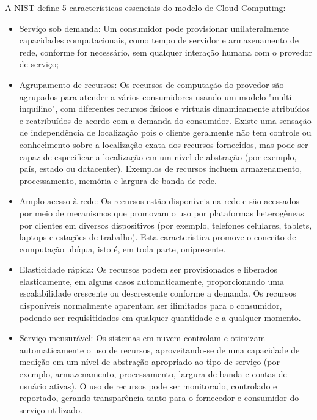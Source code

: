 A NIST define 5 características essenciais do modelo de Cloud Computing:
\begin{itemize}
	\item Serviço sob demanda: Um consumidor pode provisionar unilateralmente capacidades computacionais, como tempo de servidor e armazenamento de rede, conforme for necessário, sem qualquer interação humana com o provedor de serviço;
	\item Agrupamento de recursos: Os recursos de computação do provedor são agrupados para atender a vários consumidores usando um modelo "multi inquilino", com diferentes recursos físicos e virtuais dinamicamente atribuídos e reatribuídos de acordo com a demanda do consumidor. Existe uma sensação de independência de localização pois o cliente geralmente não tem controle ou conhecimento sobre a localização exata dos recursos fornecidos, mas pode ser capaz de especificar a localização em um nível de abstração (por exemplo, país, estado ou datacenter). Exemplos de recursos incluem armazenamento, processamento, memória e largura de banda de rede.
	\item Amplo acesso à rede: Os recursos estão disponíveis na rede e são acessados por meio de mecanismos que promovam o uso por plataformas heterogêneas por clientes em diversos dispositivos (por exemplo, telefones celulares, tablets, laptops e estações de trabalho). Esta característica promove o conceito de computação ubíqua, isto é, em toda parte, onipresente.
	\item Elasticidade rápida: Os recursos podem ser provisionados e liberados elasticamente, em alguns casos automaticamente, proporcionando uma escalabilidade crescente ou descrescente conforme a demanda. Os recursos disponíveis normalmente aparentam ser ilimitados para o consumidor, podendo ser requisitidados em qualquer quantidade e a qualquer momento.
	\item Serviço mensurável: Os sistemas em nuvem controlam e otimizam automaticamente o uso de recursos, aproveitando-se de uma capacidade de medição em um nível de abstração apropriado ao tipo de serviço (por exemplo, armazenamento, processamento, largura de banda e contas de usuário ativas). O uso de recursos pode ser monitorado, controlado e reportado, gerando transparência tanto para o fornecedor e consumidor do serviço utilizado.
\end{itemize}
